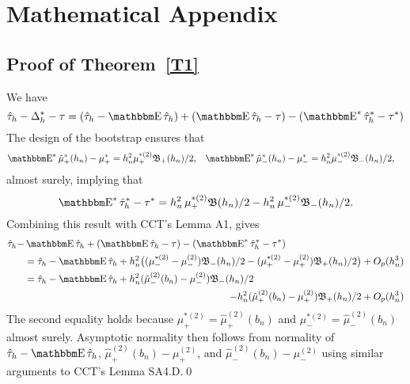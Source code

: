 \documentclass[12pt,fleqn]{article}
\begin{document}
\newpage\appendix
\section{Mathematical Appendix}
\subsection{Proof of Theorem~\ref{T1}}
We have
\begin{equation*}
  \hat\tau_h - \Delta^*_h - \tau = (\hat\tau_h - \E \hat \tau_h) +
  (\E \hat \tau_h - \tau) - (\E^* \hat \tau^*_h - \tau^*)
\end{equation*}
The design of the bootstrap ensures that
\begin{align*}
  \label{eq:6}
  \E^* \hat\mu_{+}^*(h_n) - \mu_{+}^{*}
  &= h_n^{2} \mu_+^{*(2)} \Bf_{+}(h_n)/2,
  &\E^* \hat\mu_{-}^*(h_n) - \mu_{-}^{*}
  &= h_n^{2} \mu_-^{*(2)} \Bf_{-}(h_n)/2,
\end{align*}
almost surely, implying that
\begin{equation*}
  \label{eq:7}
    \E^* \hat\tau^{*}_h - \tau^{*} = h_n^2\, \mu_+^{*(2)} \Bf(h_n)/2
      - h_n^2\, \mu_{-}^{*(2)} \Bf_{-}(h_n)/2.
\end{equation*}
Combining this result with CCT's Lemma A1, gives
\begin{align}
  \hat\tau_h - & \E \hat\tau_h + (\E \hat\tau_h - \tau) - (\E^* \hat\tau^*_h - \tau^*)\notag \\
  \label{eq:8}
  &= \hat\tau_h - \E\hat\tau_h
   + h_n^2 \big((\mu_{-}^{*(2)} - \mu_{-}^{(2)}) \Bf_{-}(h_{n}) /2
   - (\mu_+^{*(2)}-\mu_+^{(2)}) \Bf_{+}(h_{n}) / 2 \big) + O_p(h_n^{3}) \\
  &= \hat\tau_h - \E\hat\tau_h
   + h_n^2 (\hat\mu_-^{(2)}(b_n) - \mu_-^{(2)}) \Bf_{-}(h_{n}) /2 \notag \\
  \label{eq:9}
  &\pushright{- h_n^2 (\hat\mu_+^{(2)}(b_n) - \mu_+^{(2)}) \Bf_{+}(h_{n}) / 2 + O_p(h_n^{3})}
\end{align}
The second equality holds because
$\mu_+^{*(2)} = \hat\mu_{+}^{(2)}(b_n)$ and
$\mu_-^{*(2)} = \hat\mu_{-}^{(2)}(b_n)$ almost surely. Asymptotic
normality then follows from normality of $\hat\tau_h - \E\hat\tau_h$,
$\hat\mu_+^{(2)}(b_n) - \mu_+^{(2)}$, and
$\hat\mu_-^{(2)}(b_n) - \mu_-^{(2)}$ using similar arguments to
CCT's Lemma SA4.D.\qed
\end{document}

